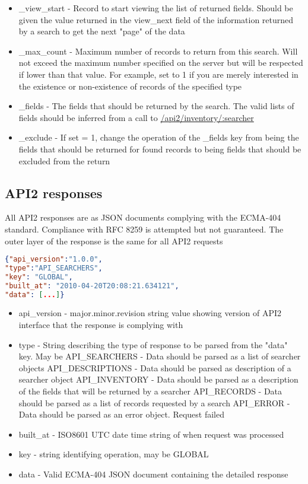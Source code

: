 \documentclass[11pt]{article}
\begin{document}
\begin{itemize}
\item \_view\_start - Record to start viewing the list of returned fields. Should be given the value returned in the view\_next field of the information returned by a search to get the next "page" of the data
\item \_max\_count - Maximum number of records to return from this search. Will not exceed the maximum number specified on the server but will be respected if lower than that value. For example, set to 1 if you are merely interested in the existence or non-existence of records of the specified type
\item \_fields - The fields that should be returned by the search. The valid lists of fields should be inferred from a call to \url{/api2/inventory/:searcher} 
\item \_exclude - If set = 1, change the operation of the \_fields key from being the fields that should be returned for found records to being fields that should be excluded from the return
\end{itemize}

\subsection{API2 responses}
All API2 responses are as JSON documents complying with the ECMA-404 standard. Compliance with RFC 8259 is attempted but not guaranteed. The outer layer of the response is the same for all API2 requests

\begin{lstlisting}[language=json,firstnumber=1]
{"api_version":"1.0.0",
"type":"API_SEARCHERS",
"key": "GLOBAL",
"built_at": "2010-04-20T20:08:21.634121",
"data": [...]}
\end{lstlisting}
\begin{itemize}
\item api\_version - major.minor.revision string value showing version of API2 interface that the response is complying with
\item type - String describing the type of response to be parsed from the "data" key. May be
\subitem API\_SEARCHERS - Data should be parsed as a list of searcher objects
\subitem API\_DESCRIPTIONS - Data should be parsed as description of a searcher object
\subitem API\_INVENTORY - Data should be parsed as a description of the fields that will be returned by a searcher
\subitem API\_RECORDS - Data should be parsed as a list of records requested by a search
\subitem API\_ERROR - Data should be parsed as an error object. Request failed
\item built\_at - ISO8601 UTC date time string of when request was processed
\item key - string identifying operation, may be GLOBAL
\item data - Valid ECMA-404 JSON document containing the detailed response
\end{itemize}
\end{document}
